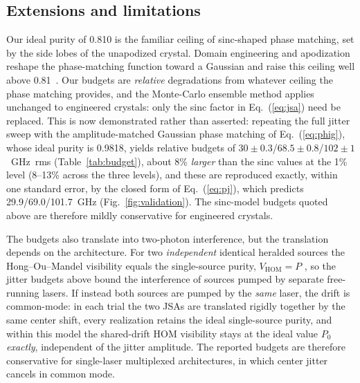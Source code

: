 \subsection*{Extensions and limitations}

Our ideal purity of 0.810 is the familiar ceiling of sinc-shaped
phase matching, set by the side lobes of the unapodized crystal.
Domain engineering and apodization reshape the phase-matching function
toward a Gaussian and raise this ceiling well above
0.81~\cite{branczyk2011,graffitti2018}. Our budgets are
\emph{relative} degradations from whatever ceiling the phase matching
provides, and the Monte-Carlo ensemble method applies unchanged to
engineered crystals: only the sinc factor in Eq.~(\ref{eq:jsa}) need
be replaced. This is now demonstrated rather than asserted: repeating
the full jitter sweep with the amplitude-matched Gaussian phase
matching of Eq.~(\ref{eq:phig}), whose ideal purity is 0.9818, yields
relative budgets of $30 \pm 0.3$/$68.5 \pm 0.8$/$102 \pm 1$~GHz~rms
(Table~\ref{tab:budget}), about 8\% \emph{larger} than the sinc
values at the 1\% level (8--13\% across the three levels), and these
are reproduced exactly, within one standard error, by the closed form
of Eq.~(\ref{eq:pj}), which predicts 29.9/69.0/101.7~GHz
(Fig.~\ref{fig:validation}). The sinc-model budgets quoted above are
therefore mildly conservative for engineered crystals.

The budgets also translate into two-photon interference, but the
translation depends on the architecture. For two \emph{independent}
identical heralded sources the Hong--Ou--Mandel visibility equals the
single-source purity, $V_{\mathrm{HOM}} = P$
\cite{hong1987,mosley2008}, so the jitter budgets above bound the
interference of sources pumped by separate free-running lasers. If
instead both sources are pumped by the \emph{same} laser, the drift
is common-mode: in each trial the two JSAs are translated rigidly
together by the same center shift, every realization retains the
ideal single-source purity, and within this model the shared-drift
HOM visibility stays at the ideal value $P_0$ \emph{exactly},
independent of the jitter amplitude. The reported budgets are
therefore conservative for single-laser multiplexed architectures, in
which center jitter cancels in common mode.

